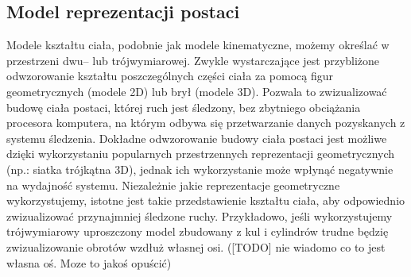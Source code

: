 	\subsection{Model reprezentacji postaci}
	Modele kształtu ciała, podobnie jak modele kinematyczne, możemy określać w przestrzeni dwu-- lub trójwymiarowej. Zwykle wystarczające jest przybliżone odwzorowanie kształtu poszczególnych części ciała za pomocą figur geometrycznych (modele 2D) lub brył (modele 3D). Pozwala to zwizualizować budowę ciała postaci, której ruch jest śledzony, bez zbytniego obciążania procesora komputera, na którym odbywa się przetwarzanie danych pozyskanych z systemu śledzenia. Dokładne odwzorowanie budowy ciała postaci jest możliwe dzięki wykorzystaniu popularnych przestrzennych reprezentacji geometrycznych (np.: siatka trójkątna 3D), jednak ich wykorzystanie może wpłynąć negatywnie na wydajność systemu. 
	Niezależnie jakie reprezentacje geometryczne wykorzystujemy, istotne jest takie przedstawienie kształtu ciała, aby odpowiednio zwizualizować przynajmniej śledzone ruchy. Przykładowo, jeśli wykorzystujemy trójwymiarowy uproszczony model zbudowany z kul i cylindrów trudne będzię zwizualizowanie obrotów wzdłuż własnej osi. ([TODO] nie wiadomo co to jest własna oś. Moze to jakoś opuścić)\\
	
